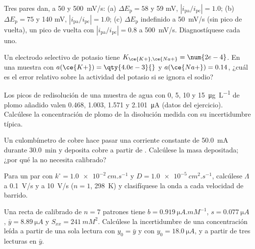 \begin{exercise}[$\star\star$]\label{exo:b3:electrode-kinetics:7}
Tres pares dan, a 50 y \qty{500}{mV/s}: (a) $\Delta E_{\mathrm p} = 58$ y 59 mV, $|i_{\mathrm{pa}}/i_{\mathrm{pc}}| = 1.0$;
(b) $\Delta E_{\mathrm p} = 75$ y 140 mV, $|i_{\mathrm{pa}}/i_{\mathrm{pc}}| = 1.0$; (c) $\Delta E_{\mathrm p}$ indefinido a \qty{50}{mV/s} (sin
pico de vuelta), un pico de vuelta con $|i_{\mathrm{pa}}/i_{\mathrm{pc}}| = 0.8$ a \qty{500}{mV/s}. Diagnostíquese cada uno.
\end{exercise}

\begin{exercise}[$\star\star$]\label{exo:b3:electrode-kinetics:8}
Un electrodo selectivo de potasio tiene $K_{\ce{K+},\ce{Na+}} = \num{2e-4}$. En una muestra con $a(\ce{K+}) =
\qty{4.0e-3}{}$ y $a(\ce{Na+}) = 0.14$, ¿cuál es el error relativo sobre la actividad del potasio si
se ignora el sodio?
\end{exercise}

\begin{exercise}[$\star\star$]\label{exo:b3:electrode-kinetics:9}
Los picos de redisolución de una muestra de agua con 0, 5, 10 y \qty{15}{\micro g.L^{-1}} de plomo
añadido valen 0.468, 1.003, 1.571 y \qty{2.101}{\micro A} (datos del ejercicio). Calcúlese la
concentración de plomo de la disolución medida con su incertidumbre típica.
\end{exercise}

\begin{exercise}[$\star\star\star$]\label{exo:b3:electrode-kinetics:10}
Un culombímetro de cobre hace pasar una corriente constante de \qty{50.0}{mA} durante \qty{30.0}{min} y deposita cobre
a partir de . Calcúlese la masa depositada; ¿por qué la  no necesita
calibrado?
\end{exercise}

\begin{exercise}[$\star\star\star$]\label{exo:b3:electrode-kinetics:11}
Para un par con $k^\circ = \qty{1.0e-2}{cm.s^{-1}}$ y $D = \qty{1.0e-5}{cm^2.s^{-1}}$, calcúlese $\Lambda$ a \qty{0.1}{V/s}
y a \qty{10}{V/s} ($n = 1$, \qty{298}{K}) y clasifíquese la onda a cada velocidad de barrido.
\end{exercise}

\begin{exercise}[$\star\star\star$]\label{exo:b3:electrode-kinetics:12}
Una recta de calibrado de $n = 7$ patrones tiene $b = \qty{0.919}{\micro A.mM^{-1}}$, $s = \qty{0.077}{\micro A}$,
$\bar y = \qty{8.89}{\micro A}$ y $S_{xx} = \qty{241}{mM^2}$. Calcúlese la incertidumbre de una concentración leída
a partir de una sola lectura con $y_0 = \bar y$ y con $y_0 = \qty{18.0}{\micro A}$, y a partir de tres lecturas en $\bar y$.
\end{exercise}

